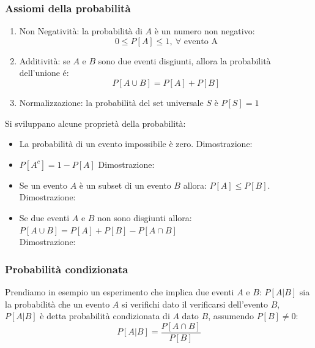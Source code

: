         \subsubsection{Assiomi della probabilità}
            \begin{enumerate}
                \item \label{Ass. Prob. 1}{Non Negatività: la probabilità di $A$ è un numero non negativo:
                    \[
                        0\leq P[A] \leq 1,\ \forall \text{ evento A}
                    \]
                }
                \item \label{Ass. Prob. 2}{Additività: se $A$ e $B$ sono due eventi disgiunti, allora la probabilità dell'unione é: 
                    \[
                        P[A\cup B] = P[A] + P[B] 
                    \]
                }
                \item \label{Ass. Prob. 3}{Normalizzazione: la probabilità del set universale $S$ è $P[S] = 1$}
            \end{enumerate}
            Si sviluppano alcune proprietà della probabilità:
            \begin{itemize}
                \item {
                    La probabilità di un evento impossibile è zero.
                    Dimostrazione:
                }
                \item {
                    $P[A^c] = 1-P[A]$
                    Dimostrazione:
                }
                \item {
                    Se un evento $A$ è un subset di un evento $B$ allora: $P[A]\leq P[B]$. 
                    Dimostrazione: 
                }
                \item {
                    \begin{sloppypar}
                        Se due eventi $A$ e $B$ non sono disgiunti allora: ${P[A \cup B]= P[A] + P[B] -  P[A\cap B]}$\\
                        Dimostrazione:
                    \end{sloppypar}
                }
            \end{itemize}
        \subsubsection{Probabilità condizionata}\label{Probabilità condizionata}
            Prendiamo in esempio un esperimento che implica due eventi $A$ e $B$: $P[A|B]$ sia la probabilità che un evento $A$ si verifichi
            dato il verificarsi dell'evento $B$, $P[A|B]$ è detta probabilità condizionata di $A$ dato $B$, assumendo $P[B]\neq 0$:
            \[
                P[A|B] = \frac{P[A\cap B]}{P[B]}
            \]

